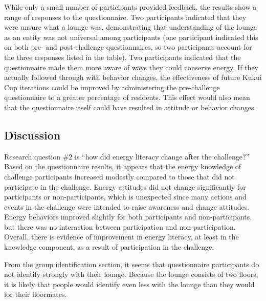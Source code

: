 While only a small number of participants provided feedback, the results show a range of responses to the questionnaire. Two participants indicated that they were unsure what a lounge was, demonstrating that understanding of the lounge as an entity was not universal among participants (one participant indicated this on both pre- and post-challenge questionnaires, so two participants account for the three responses listed in the table). Two participants indicated that the questionnaire made them more aware of ways they could conserve energy. If they actually followed through with behavior changes, the effectiveness of future Kukui Cup iterations could be improved by administering the pre-challenge questionnaire to a greater percentage of residents. This effect would also mean that the questionnaire itself could have resulted in attitude or behavior changes.


\subsection{Discussion}

Research question \#2 is ``how did energy literacy change after the challenge?'' Based on the questionnaire results, it appears that the energy knowledge of challenge participants increased modestly compared to those that did not participate in the challenge. Energy attitudes did not change significantly for participants or non-participants, which is unexpected since many actions and events in the challenge were intended to raise awareness and change attitudes. Energy behaviors improved slightly for both participants and non-participants, but there was no interaction between participation and non-participation. Overall, there is evidence of improvement in energy literacy, at least in the knowledge component, as a result of participation in the challenge.

From the group identification section, it seems that questionnaire participants do not identify strongly with their lounge. Because the lounge consists of two floors, it is likely that people would identify even less with the lounge than they would for their floormates.

